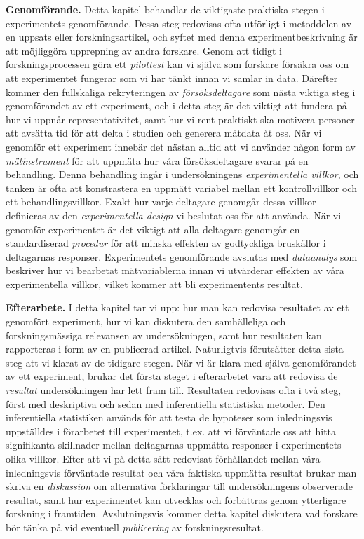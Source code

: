 \documentclass[
]{book}
\begin{document}
\textbf{Genomförande.} Detta kapitel behandlar de viktigaste praktiska stegen i experimentets genomförande. Dessa steg redovisas ofta utförligt i metoddelen av en uppsats eller forskningsartikel, och syftet med denna experimentbeskrivning är att möjliggöra upprepning av andra forskare. Genom att tidigt i forskningsprocessen göra ett \emph{pilottest} kan vi själva som forskare försäkra oss om att experimentet fungerar som vi har tänkt innan vi samlar in data. Därefter kommer den fullskaliga rekryteringen av \emph{försöksdeltagare} som nästa viktiga steg i genomförandet av ett experiment, och i detta steg är det viktigt att fundera på hur vi uppnår representativitet, samt hur vi rent praktiskt ska motivera personer att avsätta tid för att delta i studien och generera mätdata åt oss. När vi genomför ett experiment innebär det nästan alltid att vi använder någon form av \emph{mätinstrument} för att uppmäta hur våra försöksdeltagare svarar på en behandling. Denna behandling ingår i undersökningens \emph{experimentella villkor}, och tanken är ofta att konstrastera en uppmätt variabel mellan ett kontrollvillkor och ett behandlingsvillkor. Exakt hur varje deltagare genomgår dessa villkor definieras av den \emph{experimentella design} vi beslutat oss för att använda. När vi genomför experimentet är det viktigt att alla deltagare genomgår en standardiserad \emph{procedur} för att minska effekten av godtyckliga bruskällor i deltagarnas responser. Experimentets genomförande avslutas med \emph{dataanalys} som beskriver hur vi bearbetat mätvariablerna innan vi utvärderar effekten av våra experimentella villkor, vilket kommer att bli experimentents resultat.

\textbf{Efterarbete.} I detta kapitel tar vi upp: hur man kan redovisa resultatet av ett genomfört experiment, hur vi kan diskutera den samhälleliga och forskningsmässiga relevansen av undersökningen, samt hur resultaten kan rapporteras i form av en publicerad artikel. Naturligtvis förutsätter detta sista steg att vi klarat av de tidigare stegen. När vi är klara med själva genomförandet av ett experiment, brukar det första steget i efterarbetet vara att redovisa de \emph{resultat} undersökningen har lett fram till. Resultaten redovisas ofta i två steg, först med deskriptiva och sedan med inferentiella statistiska metoder. Den inferentiella statistiken används för att testa de hypoteser som inledningsvis uppställdes i förarbetet till experimentet, t.ex. att vi förväntade oss att hitta signifikanta skillnader mellan deltagarnas uppmätta responser i experimentets olika villkor. Efter att vi på detta sätt redovisat förhållandet mellan våra inledningsvis förväntade resultat och våra faktiska uppmätta resultat brukar man skriva en \emph{diskussion} om alternativa förklaringar till undersökningens observerade resultat, samt hur experimentet kan utvecklas och förbättras genom ytterligare forskning i framtiden. Avslutningsvis kommer detta kapitel diskutera vad forskare bör tänka på vid eventuell \emph{publicering} av forskningsresultat.
\end{document}
